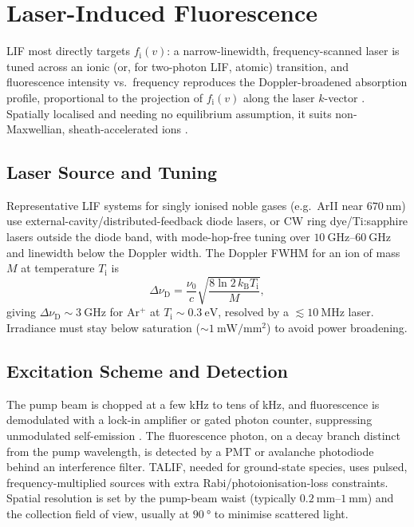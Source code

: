 \section{Laser-Induced Fluorescence}
\label{sec:specs-lif}

LIF most directly targets $f_{\mathrm{i}}(v)$: a narrow-linewidth, frequency-scanned laser is tuned across an ionic (or, for two-photon LIF, atomic) transition, and fluorescence intensity vs.\ frequency reproduces the Doppler-broadened absorption profile, proportional to the projection of $f_{\mathrm{i}}(v)$ along the laser $k$-vector \cite{ref0292,ref0300}. Spatially localised and needing no equilibrium assumption, it suits non-Maxwellian, sheath-accelerated ions \cite{ref0304,ref0322}.

\subsection{Laser Source and Tuning}

Representative LIF systems for singly ionised noble gases (e.g.\ ArII near $\SI{670}{\nano\meter}$) use external-cavity/distributed-feedback diode lasers, or CW ring dye/Ti:sapphire lasers outside the diode band, with mode-hop-free tuning over $\SIrange{10}{60}{\giga\hertz}$ and linewidth below the Doppler width. The Doppler FWHM for an ion of mass $M$ at temperature $T_{\mathrm{i}}$ is
\begin{equation}
\Delta\nu_{\mathrm{D}} = \frac{\nu_{0}}{c} \sqrt{\frac{8 \ln 2 \, k_{\mathrm{B}} T_{\mathrm{i}}}{M}} ,
\label{eq:specs-doppler}
\end{equation}
giving $\Delta\nu_{\mathrm{D}} \sim \SI{3}{\giga\hertz}$ for Ar$^{+}$ at $T_{\mathrm{i}} \sim \SI{0.3}{\electronvolt}$, resolved by a $\lesssim \SI{10}{\mega\hertz}$ laser. Irradiance must stay below saturation ($\sim\SI{1}{\milli\watt\per\milli\meter\squared}$) to avoid power broadening.

\subsection{Excitation Scheme and Detection}

The pump beam is chopped at a few kHz to tens of kHz, and fluorescence is demodulated with a lock-in amplifier or gated photon counter, suppressing unmodulated self-emission \cite{ref0300,ref0304}. The fluorescence photon, on a decay branch distinct from the pump wavelength, is detected by a PMT or avalanche photodiode behind an interference filter. TALIF, needed for ground-state species, uses pulsed, frequency-multiplied sources with extra Rabi/photoionisation-loss constraints. Spatial resolution is set by the pump-beam waist (typically $\SIrange{0.2}{1}{\milli\meter}$) and the collection field of view, usually at $\SI{90}{\degree}$ to minimise scattered light.

